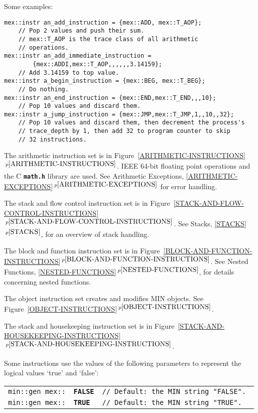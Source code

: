 \documentclass[12pt]{article}
\makeatletter
\newcommand{\TT}[1]{{\tt \bfseries #1}}
\newcommand{\ttkey}[1]{\TT{#1}\index{#1@{\tt #1}}}
\newcommand{\itemref}[1]{\ref{#1}$\,^{p\pageref{#1}}$}
\newenvironment{indpar}[1][0.3in]%
	{\begin{list}{}%
		     {\setlength{\itemsep}{0in}%
		      \setlength{\topsep}{0in}%
		      \setlength{\parsep}{1ex}%
		      \setlength{\labelwidth}{#1}%
		      \setlength{\leftmargin}{#1}%
		      \addtolength{\leftmargin}{\labelsep}}%
	 \item}%
	{\end{list}}
\makeatother
\begin{document}
Some examples:
\begin{indpar}\begin{verbatim}
mex::instr an_add_instruction = {mex::ADD, mex::T_AOP};
    // Pop 2 values and push their sum.
    // mex::T_AOP is the trace class of all arithmetic
    // operations.
mex::instr an_add_immediate_instruction =
        {mex::ADDI,mex::T_AOP,,,,,,3.14159};
    // Add 3.14159 to top value.
mex::instr a_begin_instruction = {mex::BEG, mex::T_BEG};
    // Do nothing.
mex::instr an_end_instruction = {mex::END,mex::T_END,,,10};
    // Pop 10 values and discard them.
mex::instr a_jump_instruction = {mex::JMP,mex::T_JMP,1,,10,,32};
    // Pop 10 values and discard them, then decrement the process's
    // trace_depth by 1, then add 32 to program counter to skip
    // 32 instructions.
\end{verbatim}\end{indpar}

The arithmetic instruction set is in Figure~\itemref{ARITHMETIC-INSTRUCTIONS}.
IEEE 64-bit floating point operations and the C \TT{math.h}
library are used.  See Arithmetic Exceptions,
\itemref{ARITHMETIC-EXCEPTIONS} for error
handling.

The stack and flow control instruction set is in
Figure~\itemref{STACK-AND-FLOW-CONTROL-INSTRUCTIONS}.
See Stacks, \itemref{STACKS}, for an overview of stack handling.

The block and function instruction set is in
Figure~\itemref{BLOCK-AND-FUNCTION-INSTRUCTIONS}.
See Nested Functions, \itemref{NESTED-FUNCTIONS},
for details concerning nested functions.

The object instruction set creates and modifies MIN objects.
See Figure~\itemref{OBJECT-INSTRUCTIONS}.

The stack and housekeeping instruction set is in
Figure~\itemref{STACK-AND-HOUSEKEEPING-INSTRUCTIONS}.

Some instructions use the values of the following parameters to represent
the logical values `true' and `false':

\hspace*{0.3in}\begin{tabular}{rll}
\tt min::gen mex::& \ttkey{FALSE} & \tt // Default: the MIN string "FALSE". \\
\tt min::gen mex::& \ttkey{TRUE}  & \tt // Default: the MIN string "TRUE".  \\
\end{tabular}

\pagebreak
\end{document}
